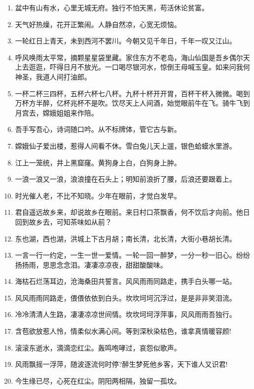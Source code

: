 \begin{tcolorbox}[
  colback=white, %
  colframe=black, 
  boxrule=1pt,        %
  arc=0mm             %
  ]
  \kaishu 
  \begin{enumerate}
      \item 盆中有山有水，心里无城无府。独行不怕天黑，苟活休论贫富。
      \item 天气好热燥，花开正繁闹。人静自然凉，心宽无烦恼。
      \item 一轮红日上青天，未到西河不罢川。今朝又见千年日，千年一叹又江山。
      \item 呼风唤雨太平常，摘颗星星袋里藏。家住东方不老岛，海山仙国是吾乡偶尔天上去逛逛，吓得日月不放光。一口喝尽银河水，惊倒王母喊玉皇。如来问我何神圣，我道人间打油郎。
      \item 一杯二杯三四杯，五杯六杯七八杯。九杯十杯开开胃，百杯干杯入微微。喝到万杯方半醉，亿杯兆杯不是吹。饮尽天上人间酒，始觉眼前牛在飞。骑牛飞到月宫去，嫦娥姐姐来作陪。
      \item 吾手写吾心，诗词随口吟。从不标牌体，管它古与新。
      \item 嫦娥仙子爱出楼，惹得人间看不休。雪白兔儿天上遛，银色蛤蟆水里游。
      \item 江上一笼统，井上黑窟窿。黄狗身上白，白狗身上肿。
      \item 一浪一浪又一浪，浪浪撞在石头上；明知前浪折了腰，后浪还要跟着上。
      \item 时光催人老，不比不知晓。少年在眼前，才觉白发早。
      \item 君自遥远故乡来，却说故乡在眼前。来日村口茶飘香，何不饮后才向前。他日回到故乡去，可知茶味如从前？
      \item 东也湖，西也湖，洪城上下古月胡；南长清，北长清，大街小巷胡长清。
      \item 一言一行一约定，一生一世一爱情。一轮一回一醉梦，一分一秒一旧心。纷纷扬扬雨，思思念念泪。凄凄凉凉夜，甜甜酸酸味。
      \item 海枯石烂荡耳边，沧海桑田共誓言。风风雨雨同路走，携手白头哪一站。
      \item 风风雨雨同路走，偎偎依依到白头。坎坎坷坷沉浮过，是是非非笑泪流。
      \item 冷冷清清人生路，凄凄凉凉世间情。坎坎坷坷浮萍事，风风雨雨吾独行。
      \item 含苞欲放惹人怜，情柔似水满心间。等到深秋染枯色，谁拿真情暖容颜!
      \item 滚滚东逝水，滴滴恋红尘。轰鸣咆哮过，哀怨似歌声。
      \item 风雨飘摇一浮萍，随波逐流何时停?醉生梦死他乡客，天下谁人又识君!
      \item 今生缘已尽，心死在红尘。阴阳两相隔，独留一孤坟。
  \end{enumerate}
  
\end{tcolorbox}


